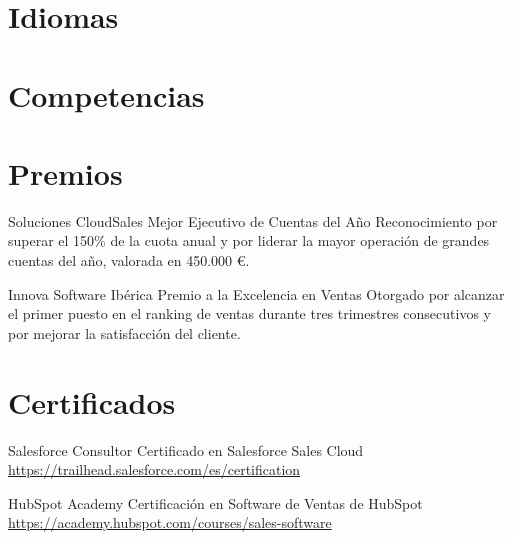 \documentclass[a4paper, serif, 10pt]{moderncv}
\begin{document}
\section{Idiomas}

\section{Competencias}

\section{Premios}

        {Soluciones CloudSales}
        {Mejor Ejecutivo de Cuentas del Año}
        {}
        {}
        {Reconocimiento por superar el 150\% de la cuota anual y por liderar la mayor operación de grandes cuentas del año, valorada en 450.000 €.}

        {Innova Software Ibérica}
        {Premio a la Excelencia en Ventas}
        {}
        {}
        {Otorgado por alcanzar el primer puesto en el ranking de ventas durante tres trimestres consecutivos y por mejorar la satisfacción del cliente.}
\section{Certificados}

        {Salesforce}
        {Consultor Certificado en Salesforce Sales Cloud}
        {\url{https://trailhead.salesforce.com/es/certification}}
        {}
        {}

        {HubSpot Academy}
        {Certificación en Software de Ventas de HubSpot}
        {\url{https://academy.hubspot.com/courses/sales-software}}
        {}
        {}
\end{document}

